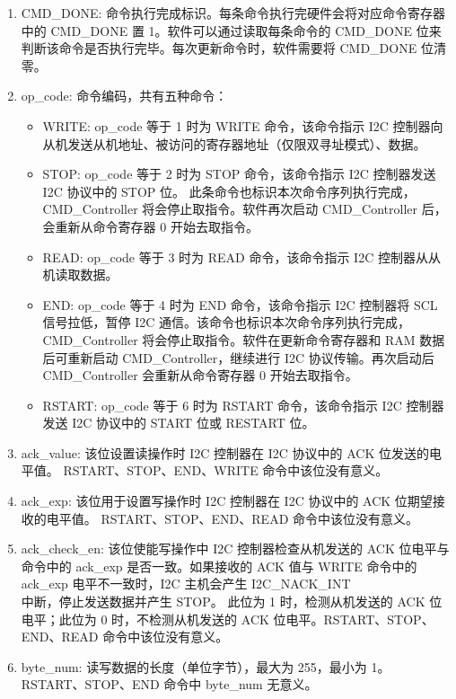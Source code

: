 \documentclass[main\_\_CN.tex]{subfiles}
\begin{document}
\begin{enumerate}
\item CMD\_DONE: 命令执行完成标识。每条命令执行完硬件会将对应命令寄存器中的 CMD\_DONE 置 1。软件可以通过读取每条命令的 CMD\_DONE 位来判断该命令是否执行完毕。每次更新命令时，软件需要将 CMD\_DONE 位清零。

\item op\_code: 命令编码，共有五种命令：

\begin{itemize}
\item WRITE: op\_code 等于 1 时为 WRITE 命令，该命令指示 I2C 控制器向从机发送从机地址、被访问的寄存器地址（仅限双寻址模式）、数据。
\item STOP: op\_code 等于 2 时为 STOP 命令，该命令指示 I2C 控制器发送 I2C 协议中的 STOP 位。 此条命令也标识本次命令序列执行完成，CMD\_Controller 将会停止取指令。软件再次启动 CMD\_Controller 后，会重新从命令寄存器 0 开始去取指令。
\item READ: op\_code 等于 3 时为 READ 命令，该命令指示 I2C 控制器从从机读取数据。
\item END: op\_code 等于 4 时为 END 命令，该命令指示 I2C 控制器将 SCL 信号拉低，暂停 I2C 通信。该命令也标识本次命令序列执行完成，CMD\_Controller 将会停止取指令。软件在更新命令寄存器和 RAM 数据后可重新启动 CMD\_Controller，继续进行 I2C 协议传输。再次启动后 CMD\_Controller 会重新从命令寄存器 0 开始去取指令。
\item RSTART: op\_code 等于 6 时为 RSTART 命令，该命令指示 I2C 控制器发送 I2C 协议中的 START 位或 RESTART 位。
\end{itemize}

\item ack\_value: 该位设置读操作时 I2C 控制器在 I2C 协议中的 ACK 位发送的电平值。 RSTART、STOP、END、WRITE 命令中该位没有意义。

\item ack\_exp: 该位用于设置写操作时 I2C 控制器在 I2C 协议中的 ACK 位期望接收的电平值。 RSTART、STOP、END、READ 命令中该位没有意义。

\item ack\_check\_en: 该位使能写操作中 I2C 控制器检查从机发送的 ACK 位电平与命令中的 ack\_exp 是否一致。如果接收的 ACK 值与 WRITE 命令中的 ack\_exp 电平不一致时，I2C 主机会产生 I2C\_NACK\_INT\\ 中断，停止发送数据并产生 STOP。 此位为 1 时，检测从机发送的 ACK 位电平；此位为 0 时，不检测从机发送的 ACK 位电平。RSTART、STOP、END、READ 命令中该位没有意义。

\item byte\_num: 读写数据的长度（单位字节），最大为 255，最小为 1。RSTART、STOP、END 命令中 byte\_num 无意义。
\end{enumerate}
\end{document}
